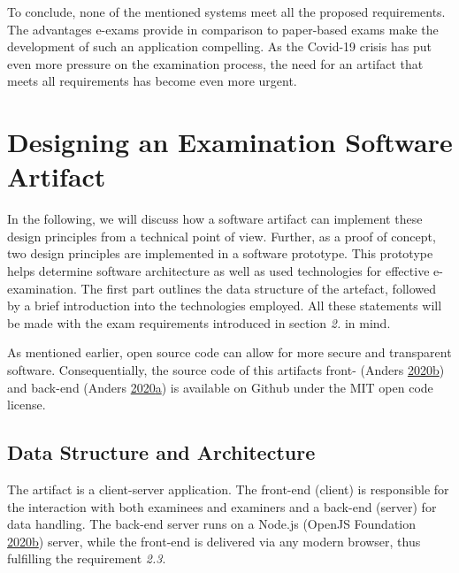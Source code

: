 To conclude, none of the mentioned systems meet all the proposed
requirements. The advantages e-exams provide in comparison to
paper-based exams make the development of such an application
compelling. As the Covid-19 crisis has put even more pressure on the
examination process, the need for an artifact that meets all
requirements has become even more urgent.

\newpage

\hypertarget{designing-an-examination-software-artifact}{%
\section{Designing an Examination Software
Artifact}\label{designing-an-examination-software-artifact}}

In the following, we will discuss how a software artifact can implement
these design principles from a technical point of view. Further, as a
proof of concept, two design principles are implemented in a software
prototype. This prototype helps determine software architecture as well
as used technologies for effective e-examination. The first part
outlines the data structure of the artefact, followed by a brief
introduction into the technologies employed. All these statements will
be made with the exam requirements introduced in section \emph{2.} in
mind.

As mentioned earlier, open source code can allow for more secure and
transparent software. Consequentially, the source code of this artifacts
front- (Anders
\protect\hyperlink{ref-XM-Frontend}{2020}\protect\hyperlink{ref-XM-Frontend}{b})
and back-end (Anders
\protect\hyperlink{ref-XM-Backend}{2020}\protect\hyperlink{ref-XM-Backend}{a})
is available on Github under the MIT open code license.

\hypertarget{data-structure-and-architecture}{%
\subsection{Data Structure and
Architecture}\label{data-structure-and-architecture}}

The artifact is a client-server application. The front-end (client) is
responsible for the interaction with both examinees and examiners and a
back-end (server) for data handling. The back-end server runs on a
Node.js (OpenJS Foundation
\protect\hyperlink{ref-Node}{2020}\protect\hyperlink{ref-Node}{b})
server, while the front-end is delivered via any modern browser, thus
fulfilling the requirement \emph{2.3}.

